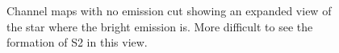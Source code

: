 \documentclass[preprint]{aastex}
\begin{document}
\begin{figure}
{          }
          \caption{Channel maps with no emission cut showing an expanded view of the star where the bright
emission is. More difficult to see the formation of S2 in this view.}
\end{figure}
\end{document}
